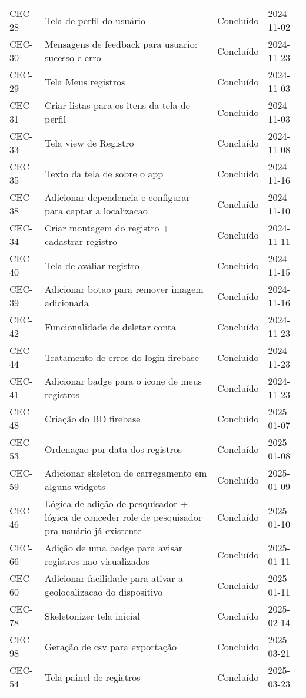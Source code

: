 \begin{longtable}{@{}lp{7cm}ll@{}}
CEC-28 & Tela de perfil do usuário & Concluído & 2024-11-02 \\
CEC-30 & Mensagens de feedback para usuario: sucesso e erro & Concluído & 2024-11-23 \\ 
CEC-29 & Tela Meus registros & Concluído & 2024-11-03 \\
CEC-31 & Criar listas para os itens da tela de perfil & Concluído & 2024-11-03 \\
CEC-33 & Tela view de Registro & Concluído & 2024-11-08 \\
CEC-35 & Texto da tela de sobre o app & Concluído & 2024-11-16 \\
CEC-38 & Adicionar dependencia e configurar para captar a localizacao & Concluído & 2024-11-10 \\
CEC-34 & Criar montagem do registro + cadastrar registro & Concluído & 2024-11-11 \\
CEC-40 & Tela de avaliar registro & Concluído & 2024-11-15 \\
CEC-39 & Adicionar botao para remover imagem adicionada & Concluído & 2024-11-16 \\ 
CEC-42 & Funcionalidade de deletar conta & Concluído & 2024-11-23 \\
CEC-44 & Tratamento de erros do login firebase & Concluído & 2024-11-23 \\ 
CEC-41 & Adicionar badge para o icone de meus registros & Concluído & 2024-11-23 \\ 
CEC-48 & Criação do BD firebase & Concluído & 2025-01-07 \\
CEC-53 & Ordenaçao por data dos registros & Concluído & 2025-01-08 \\
CEC-59 & Adicionar skeleton de carregamento em alguns widgets & Concluído & 2025-01-09 \\
CEC-46 & Lógica de adição de pesquisador + lógica de conceder role de pesquisador pra usuário já existente & Concluído & 2025-01-10 \\
CEC-66 & Adição de uma badge para avisar registros nao visualizados & Concluído & 2025-01-11 \\
CEC-60 & Adicionar facilidade para ativar a geolocalizacao do dispositivo & Concluído & 2025-01-11 \\
CEC-78 & Skeletonizer tela inicial & Concluído & 2025-02-14 \\
CEC-98 & Geração de csv para exportação & Concluído & 2025-03-21 \\
CEC-54 & Tela painel de registros & Concluído & 2025-03-23 \\

\end{longtable}

